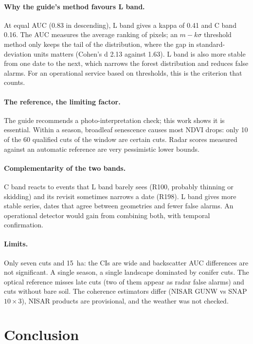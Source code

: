 \paragraph{Why the guide's method favours L band.} At equal AUC (0.83 in descending), L band gives a kappa of
0.41 and C band 0.16. The AUC measures the average ranking of pixels; an $m-k\sigma$ threshold method only keeps
the tail of the distribution, where the gap in standard-deviation units matters (Cohen's d 2.13 against 1.63).
L band is also more stable from one date to the next, which narrows the forest distribution and reduces false
alarms. For an operational service based on thresholds, this is the criterion that counts.

\paragraph{The reference, the limiting factor.} The guide recommends a photo-interpretation check; this work shows
it is essential. Within a season, broadleaf senescence causes most NDVI drops: only 10 of the 60 qualified cuts of
the window are certain cuts. Radar scores measured against an automatic reference are very pessimistic lower
bounds.

\paragraph{Complementarity of the two bands.} C band reacts to events that L band barely sees (R100, probably
thinning or skidding) and its revisit sometimes narrows a date (R198). L band gives more stable series, dates that
agree between geometries and fewer false alarms. An operational detector would gain from combining both, with
temporal confirmation.

\paragraph{Limits.} Only seven cuts and 15~ha: the CIs are wide and backscatter AUC differences are not
significant. A single season, a single landscape dominated by conifer cuts. The optical reference misses late
cuts (two of them appear as radar false alarms) and cuts without bare soil. The coherence estimators differ
(NISAR GUNW vs SNAP $10\times3$), NISAR products are provisional, and the weather was not checked.

\section{Conclusion}

